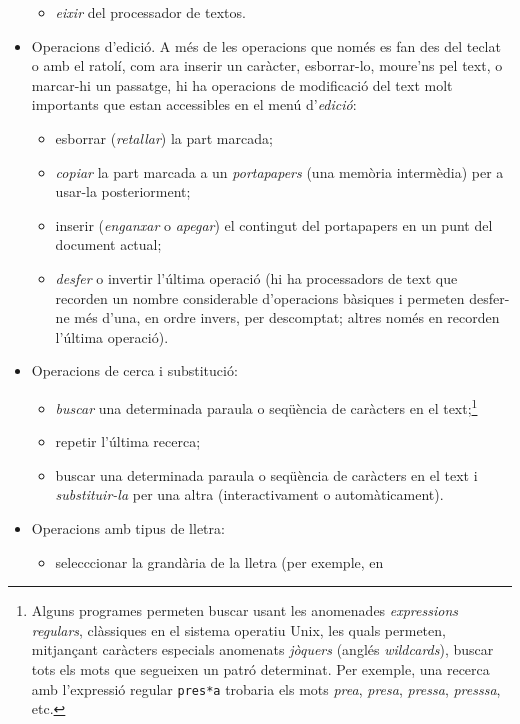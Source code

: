 \begin{itemize}
\begin{itemize}
     \item \emph{eixir} del processador de textos.
     \end{itemize}
\item Operacions d'edició. A més de les operacions que només es
  fan des del teclat o amb el ratolí, com ara inserir un caràcter, esborrar-lo,
  moure'ns pel text, o marcar-hi un passatge, hi ha operacions de
  modificació del text molt importants que estan accessibles en el
  menú d'\emph{edició}:
     \begin{itemize}
     \item esborrar (\emph{retallar}) la part marcada;
     \item \emph{copiar} la part marcada a un \emph{portapapers} (una
       memòria intermèdia) per a usar-la posteriorment;
     \item inserir (\emph{enganxar} o \emph{apegar}) 
          el contingut del portapapers
           en un punt del document actual;
     \item \emph{desfer} o invertir l'última operació
       (hi ha processadors de text que recorden un nombre considerable
       d'operacions bàsiques i permeten desfer-ne més d'una, en ordre
       invers, per descomptat; altres només en recorden l'última operació).
     \end{itemize}
\item Operacions de cerca i substitució:
     \begin{itemize}
     \item \emph{buscar} una determinada paraula o seqüència de
caràcters en el text;\footnote{Alguns programes permeten buscar
  usant les anomenades \emph{expressions regulars}, clàssiques en el
  sistema operatiu Unix, les quals permeten, mitjançant caràcters
  especials anomenats \emph{jòquers} (anglés \emph{wildcards}), buscar
  tots els mots que segueixen un patró determinat. Per exemple, una
  recerca amb l'expressió regular \texttt{pres*a} trobaria els mots
  \emph{prea}, \emph{presa}, \emph{pressa}, \emph{presssa}, etc.}
     \item repetir l'última recerca;
     \item buscar una determinada paraula o seqüència de
           caràcters en el text i \emph{substituir-la} per una altra
           (interactivament o automàticament).
     \end{itemize}
\item Operacions amb tipus de lletra:
     \begin{itemize}
     \item selecccionar la grandària de la lletra (per exemple, en

\end{itemize}
\end{itemize}
